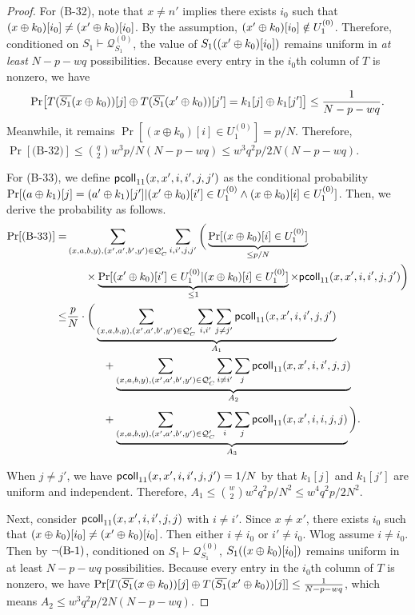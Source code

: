 \begin{proof}
For (B-32), note that $x\neq n'$ implies there exists $i_0$ such that $(x\oplus k_0)[i_0]\neq(x'\oplus k_0)[i_0]$. By the assumption, $(x'\oplus k_0)[i_0]\notin U_1^{(0)}$. Therefore, conditioned on $S_1\vdash\mathcal{Q}_{S_1}^{(0)}$, the value of $S_1((x'\oplus k_0)[i_0])$ remains uniform in {\it at least} $N-p-wq$ possibilities. Because every entry in the $i_0$th column of $T$ is nonzero, we have
%
$${\Pr}\big[T(\overline{S_1}(x\oplus k_0))[j]\oplus T(\overline{S_1}(x'\oplus k_0))[j']=k_1[j]\oplus k_1[j']\big]\leq\frac{1}{N-p-wq}.$$
%
Meanwhile, it remains $\Pr[\left(x \oplus k_{0}\right)[i]\in U_1^{(0)}]=p/N$. Therefore, $\Pr[\text{(B-32)}]\leq{q\choose2}w^3p/N(N-p-wq)\leq w^3q^2p/2N(N-p-wq)$.




For (B-33), we define $\mathsf{pcoll}_{11}(x,x',i,i',j,j')$ as the conditional probability $\Pr[(a\oplus k_1)[j]=(a'\oplus k_1)[j']|   
(x'\oplus k_0)[i']\in U_1^{(0)}\wedge(x\oplus k_0)[i]\in U_1^{(0)}]$. Then, we derive the probability as follows.        {\small
%
\begin{align*}
\Pr[\text{(B-33)}]  
=   &  \sum_{(x,a,b,y),(x',a',b',y')\in\mathcal{Q}_{C}'}\sum_{i,i',j,j'}\bigg(\underbrace{\Pr[(x\oplus k_0)[i]\in U_1^{(0)}]}_{\leq p/N}     \\
   & \ \ \ \ \ \times
	\underbrace{\Pr[(x'\oplus k_0)[i']\in U_1^{(0)}|(x\oplus k_0)[i]\in U_1^{(0)}]}_{\leq1}\times\mathsf{pcoll}_{11}(x,x',i,i',j,j') \bigg)      \\
\leq  &  \frac{p}{N}\cdot\bigg(
\underbrace{\sum_{(x,a,b,y),(x',a',b',y')\in\mathcal{Q}_{C}'}\sum_{i,i'}\sum_{j\neq j'}\mathsf{pcoll}_{11}(x,x',i,i',j,j')}_{A_1}     \\
& \ \ \ \ \ \ \ \ \ \    +  
\underbrace{\sum_{(x,a,b,y),(x',a',b',y')\in\mathcal{Q}_{C}'}\sum_{i\neq i'}\sum_{j}\mathsf{pcoll}_{11}(x,x',i,i',j,j)}_{A_2}      \\ 
& \ \ \ \ \ \ \ \ \ \    +  \underbrace{\sum_{(x,a,b,y),(x',a',b',y')\in\mathcal{Q}_{C}'}\sum_{i}\sum_{j}\mathsf{pcoll}_{11}(x,x',i,i,j,j)}_{A_3}\bigg)     .
\end{align*}
}%
%

When $j\neq j'$, we have $\mathsf{pcoll}_{11}(x,x',i,i',j,j')=1/N$ by that $k_1[j]$ and $k_1[j']$ are uniform and independent. Therefore, $A_1\leq{w\choose2}w^2q^2p/N^2\leq w^4q^2p/2N^2$.


Next, consider $\mathsf{pcoll}_{11}(x,x',i,i',j,j)$ with $i\neq i'$. Since $x\neq x'$, there exists $i_0$ such that $(x\oplus k_0)[i_0]\neq(x'\oplus k_0)[i_0]$. Then either $i\neq i_0$ or $i'\neq i_0$. Wlog assume $i\neq i_0$. Then by $\neg\text{(B-1)}$, conditioned on $S_1\vdash\mathcal{Q}_{S_1}^{(0)}$, $S_1((x\oplus k_0)[i_0])$ remains uniform in at least $N-p-wq$ possibilities. Because every entry in the $i_0$th column of $T$ is nonzero, we have ${\Pr}[T(\overline{S_1}(x\oplus k_0))[j]\oplus T(\overline{S_1}(x'\oplus k_0))[j]]\leq\frac{1}{N-p-wq}$, which means $A_2\leq w^3q^2p/2N(N-p-wq)$.




\end{proof}

